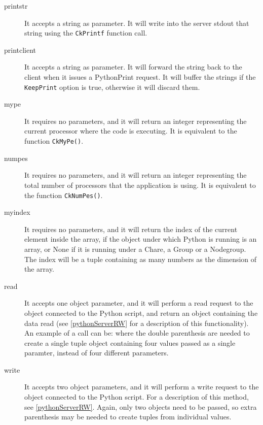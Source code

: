 \begin{description}

\item[printstr]
It accepts a string as parameter. It will write into the server stdout that string
using the \texttt{CkPrintf} function call.

\item[printclient]
It accepts a string as parameter. It will forward the string back to the client when it
issues a PythonPrint request. It will buffer the strings if the \texttt{KeepPrint}
option is true, otherwise it will discard them.

\item[mype]
It requires no parameters, and it will return an integer representing the
current processor where the code is executing. It is equivalent to the \charmpp{}
function \texttt{CkMyPe()}.

\item[numpes]
It requires no parameters, and it will return an integer representing the
total number of processors that the application is using. It is equivalent to
the \charmpp{} function \texttt{CkNumPes()}.

\item[myindex]
It requires no parameters, and it will return the index of the current element
inside the array, if the object under which Python is running is an array, or
None if it is running under a Chare, a Group or a Nodegroup. The index will be a
tuple containing as many numbers as the dimension of the array.

\item[read]
It accepts one object parameter, and it will perform a read request to the
\charmpp{} object connected to the Python script, and return an object
containing the data read (see \ref{pythonServerRW} for a description of this
functionality). An example of a call can be:
where the double parenthesis are needed to create a single tuple object
containing four values passed as a single paramter, instead of four different
parameters.

\item[write]
It accepts two object parameters, and it will perform a write request to the
\charmpp{} object connected to the Python script. For a description of this
method, see \ref{pythonServerRW}. Again, only two objects need to be passed, so
extra parenthesis may be needed to create tuples from individual values.

\end{description}

